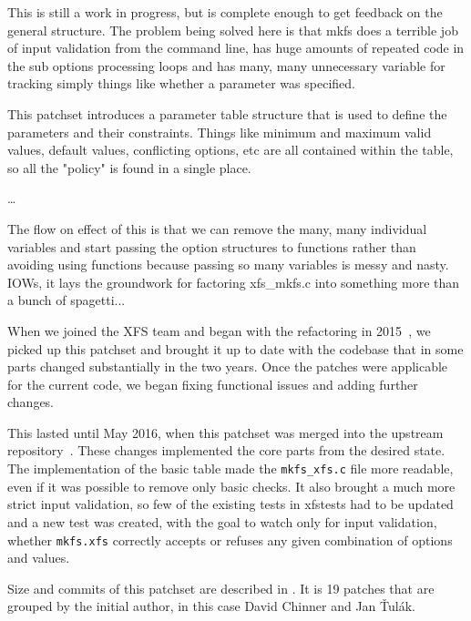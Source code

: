 \begin{displayquote}
This is still a work in progress, but is complete enough to get
feedback on the general structure. The problem being solved here is
that mkfs does a terrible job of input validation from the command
line, has huge amounts of repeated code in the sub options
processing loops and has many, many unnecessary variable for
tracking simply things like whether a parameter was specified.

This patchset introduces a parameter table structure that is used to
define the parameters and their constraints. Things like minimum and
maximum valid values, default values, conflicting options, etc are
all contained within the table, so all the "policy" is found in a
single place.

\ldots

The flow on effect of this is that we can remove the many, many
individual variables and start passing the option structures to
functions rather than avoiding using functions because passing so
many variables is messy and nasty. IOWs, it lays the groundwork for
factoring xfs\_mkfs.c into something more than a bunch of spagetti...
\end{displayquote}

When we joined the XFS team and began with the refactoring in
2015~\cite{myFirstPatches}, we picked up this patchset and brought it up to
date with the codebase that in some parts changed substantially in the two
years. Once the patches were applicable for the current code, we began
fixing functional issues and adding further changes.


This lasted until May 2016, when this patchset was merged into the upstream
repository~\cite{finalPatchset1,finalPatchset1Announce}.
These changes implemented the core parts from the desired state. The
implementation of the basic table made the {\tt mkfs\_xfs.c} file more
readable, even if it was possible to remove only basic checks. It also
brought a much more strict input validation, so few of the existing tests
in xfstests had to be updated and a new test was created, with the goal to
watch only for input validation, whether {\tt mkfs.xfs} correctly accepts
or refuses any given combination of options and values.

Size and commits of this patchset are described in
. It is 19 patches that are
grouped by the initial author, in this case David Chinner and Jan Ťulák.

